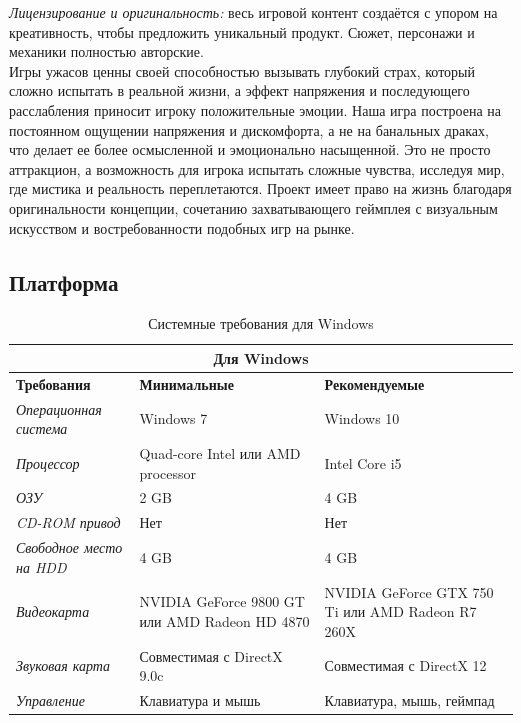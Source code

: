 \documentclass{article}
\begin{document}
	\textit{Лицензирование и оригинальность:} весь игровой контент создаётся с упором на креативность, чтобы предложить уникальный продукт. Сюжет, персонажи и механики полностью авторские. \\
	
	Игры ужасов ценны своей способностью вызывать глубокий страх, который сложно испытать в реальной жизни, а эффект напряжения и последующего расслабления приносит игроку положительные эмоции. Наша игра построена на постоянном ощущении напряжения и дискомфорта, а не на банальных драках, что делает ее более осмысленной и эмоционально насыщенной. Это не просто аттракцион, а возможность для игрока испытать сложные чувства, исследуя мир, где мистика и реальность переплетаются. Проект имеет право на жизнь благодаря оригинальности концепции, сочетанию захватывающего геймплея с визуальным искусством и востребованности подобных игр на рынке.
	
	\subsection{Платформа}
	
	\begin{table}[h!]
		\centering
		\renewcommand{\arraystretch}{1.5}
		\setlength{\tabcolsep}{8pt}
		\begin{tabular}{|p{}|p{}|p{}|}
			\hline
			\multicolumn{3}{|c|}{\textbf{Для Windows}} \\ \hline
			\textbf{Требования} & \textbf{Минимальные} & \textbf{Рекомендуемые} \\ \hline
			\textit{Операционная система} & Windows 7 & Windows 10 \\ \hline
			\textit{Процессор} & Quad-core Intel \newline или AMD processor & Intel Core i5 \\ \hline
			\textit{ОЗУ} & 2 GB & 4 GB \\ \hline
			\textit{CD-ROM привод} & Нет & Нет \\ \hline
			\textit{Свободное место на HDD} & 4 GB & 4 GB \\ \hline
			\textit{Видеокарта} & NVIDIA GeForce 9800 GT \newline или AMD Radeon HD 4870 & NVIDIA GeForce GTX 750 Ti \newline или AMD Radeon R7 260X \\ \hline
			\textit{Звуковая карта} & Совместимая с DirectX 9.0c & Совместимая с DirectX 12 \\ \hline
			\textit{Управление} & Клавиатура и мышь & Клавиатура, мышь, геймпад \\ \hline
		\end{tabular}
		\caption{Системные требования для Windows}
		\label{tab:system-requirements1}
	\end{table}
	
\end{document}
